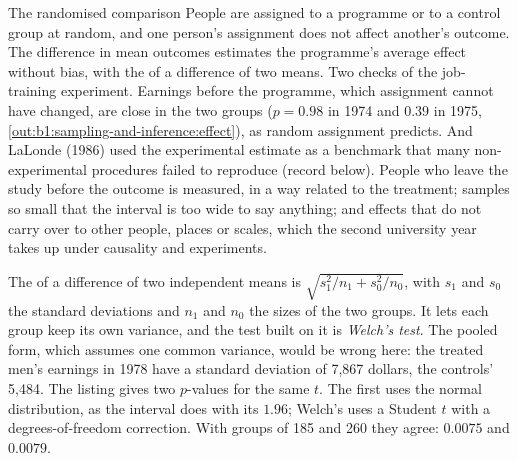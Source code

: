 \begin{model}{The randomised comparison}
\assumes People are assigned to a programme or to a control group at
random, and one person's assignment does not affect another's outcome.
\predicts The difference in mean outcomes estimates the programme's
average effect without bias, with the  of a difference of
two means.
\tested Two checks of the job-training experiment. Earnings before the
programme, which assignment cannot have changed, are close in the two
groups ($p = 0.98$ in 1974 and $0.39$ in 1975, \cref{out:b1:sampling-and-inference:effect}), as random
assignment predicts. And LaLonde (1986) used the experimental estimate as a
benchmark that many non-experimental procedures failed to reproduce (record
below). %
\breaks People who leave the study before the outcome is measured, in a way
related to the treatment; samples so small that the interval is too wide
to say anything; and effects that do not carry over to other people,
places or scales, which the second university year takes up under
causality and experiments.
\end{model}

\label{lst:b1:sampling-and-inference:effect}

\label{out:b1:sampling-and-inference:effect}

The  of a difference of two independent means is
$\sqrt{s_1^2/n_1 + s_0^2/n_0}$, with $s_1$ and $s_0$ the standard deviations and $n_1$ and $n_0$ the sizes of
the two groups. It lets each group keep its own variance, and the test built
on it is \emph{Welch's test}. The pooled form, which assumes one common
variance, would be wrong here: the treated men's earnings in 1978 have a
standard deviation of 7,867 dollars, the controls' 5,484. The listing gives
two $p$-values for the same $t$. The first uses the normal distribution, as the
interval does with its $1.96$; Welch's uses a Student $t$ with a degrees-of-freedom
correction. With groups of 185 and 260 they agree: $0.0075$ and $0.0079$.

